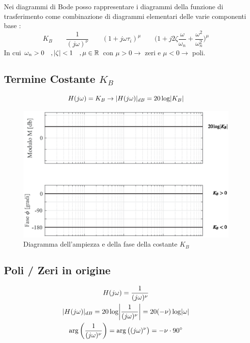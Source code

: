    Nei diagrammi di Bode posso rappresentare i diagrammi della funzione di trasferimento come combinazione di diagrammi elementari delle varie componenti base :
\[ %
	K_B \qquad 
	\frac{1}{(j\omega)^\nu} \qquad 
	(1+j\omega\tau_i)^{\mu} \qquad 
	\Big(1+j2\zeta\frac{\omega}{\omega_{n}}+\frac{\omega^2}{\omega^{2}_{n}} \Big)^{\mu}
\]
In cui $ \omega_n > 0 \quad ,\lvert\zeta\rvert<1 \quad,\mu \in \mathbb{R} $ con $ \mu > 0 \rightarrow$ zeri e $ \mu < 0 \rightarrow$ poli.

\subsection{Termine Costante $ K_B $} 
\[ H(j\omega) = K_B \rightarrow \lvert H(j\omega)\rvert_{dB} = 20 \log \lvert K_B\rvert \]
\begin{figure}[H]
	\centering
	\includegraphics[width=0.8\linewidth]{immagini/cap6_Bode/bodeCost.eps}
	\caption{ Diagramma dell'ampiezza e della fase della costante $  K_B $ }
	\label{fig:bodeCost}
\end{figure}

\subsection{Poli / Zeri in origine}

\begin{gather*}
	H(j\omega) = \frac{1}{(j\omega)^\nu}\\
	\abs{H(j\omega)}_{dB} = 20 \log \Abs{\frac{1}{(j\omega)^\nu}} = 20 ( -\nu) \log \abs{\omega} \\
	\arg \bigg(\frac{1}{(j\omega)^\nu}\bigg) = \arg \big((j\omega)^{\nu}\big) = -\nu \cdot \ang{90} 
\end{gather*}

